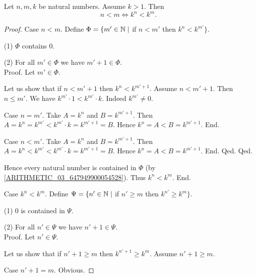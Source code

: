 \documentclass[10pt]{article}
\begin{document}
  \begin{forthel}
    \begin{proposition}
      Let $n, m, k$ be natural numbers.
      Assume $k > 1$.
      Then \[ n < m \iff k^{n} < k^{m}. \]
    \end{proposition}
    \begin{proof}
      Case $n < m$.
        Define $\Phi = \{ m' \in \mathbb{N} \mid$ if $n < m'$ then
        $k^{n} < k^{m'} \}$.

        (1) $\Phi$ contains $0$.

        (2) For all $m' \in \Phi$ we have $m' + 1 \in \Phi$. \\
        Proof.
          Let $m' \in \Phi$.

          Let us show that if $n < m' + 1$ then $k^{n} < k^{m' + 1}$.
            Assume $n < m' + 1$.
            Then $n \leq m'$.
            We have $k^{m'} \cdot 1 < k^{m'} \cdot k$.
            Indeed $k^{m'} \neq 0$.

            Case $n = m'$.
              Take $A = k^{n}$ and $B = k^{m' + 1}$. %
              Then $A
                = k^{n}
                = k^{m'}
                < k^{m'} \cdot k
                = k^{m' + 1}
                = B$.
              Hence $k^{n} = A < B = k^{m' + 1}$.
            End.

            Case $n < m'$.
              Take $A = k^{n}$ and $B = k^{m' + 1}$. %
              Then $A
                = k^{n}
                < k^{m'}
                < k^{m'} \cdot k
                = k^{m' + 1}
                = B$.
              Hence $k^{n} = A < B = k^{m' + 1}$.
            End.
          Qed.
        Qed.

        Hence every natural number is contained in $\Phi$ (by \cref{ARITHMETIC_03_647949900054528}).
        Thus $k^{n} < k^{m}$.
      End.

      Case $k^{n} < k^{m}$.
        Define $\Psi = \{ n' \in \mathbb{N} \mid$ if $n' \geq m$ then
        $k^{n'} \geq k^{m} \}$.

        (1) $0$ is contained in $\Psi$.

        (2) For all $n' \in \Psi$ we have $n' + 1 \in \Psi$. \\
        Proof.
          Let $n' \in \Psi$.

          Let us show that if $n' + 1 \geq m$ then $k^{n' + 1} \geq k^{m}$.
            Assume $n' + 1 \geq m$.

            Case $n' + 1 = m$. Obvious.


\end{proof}
\end{forthel}
\end{document}
